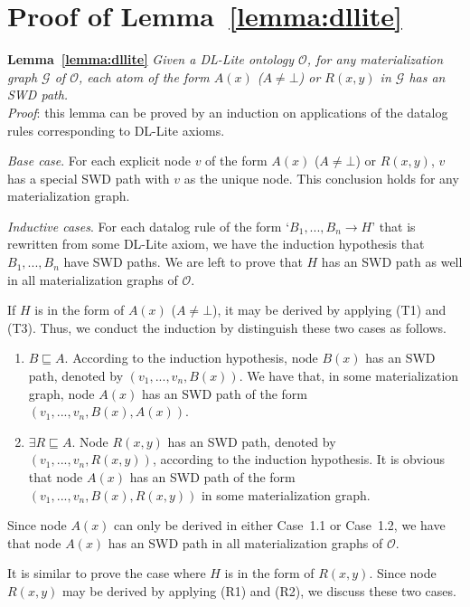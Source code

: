 \section{Proof of Lemma~\ref{lemma:dllite}}

\textbf{Lemma~\ref{lemma:dllite}}
\emph{Given a DL-Lite ontology $\mathcal{O}$, for any materialization graph $\mathcal{G}$ of $\mathcal{O}$,
each atom of the form $A(x)$ ($A\neq\bot$) or $R(x,y)$ in $\mathcal{G}$ has an SWD path.}\\

\noindent\emph{Proof}: this lemma can be proved by an induction on applications of
the datalog rules corresponding to DL-Lite axioms.

\emph{Base case}. For each explicit node $v$ of the form $A(x)$ ($A\neq\bot$) or $R(x,y)$,
$v$ has a special SWD path with $v$ as the unique node. This conclusion holds
for any materialization graph.

\emph{Inductive cases}. For each datalog rule of the form `$B_1,...,B_n\rightarrow H$'
that is rewritten from some DL-Lite axiom, we have the induction hypothesis
that $B_1,...,B_n$ have SWD paths.
We are left to prove that $H$ has an SWD path as well
in all materialization graphs of $\mathcal{O}$.

If $H$ is in the form of $A(x)$ ($A\neq\bot$), it may be derived by
applying (T1) and (T3). Thus, we conduct the induction by
distinguish these two cases as follows.

\begin{enumerate}[leftmargin=12ex,label=Case~1.\arabic*]
\item $B\sqsubseteq A$. According to the induction hypothesis,
node $B(x)$ has an SWD path, denoted by $(v_1,...,v_n,B(x))$.
We have that, in some materialization graph, node $A(x)$
has an SWD path of the form $(v_1,...,v_n,B(x),A(x))$.

\item $\exists R\sqsubseteq A$. Node $R(x,y)$ has an SWD path,
denoted by $(v_1,...,v_n,R(x,y))$,
according to the induction hypothesis.
It is obvious that node $A(x)$
has an SWD path of the form $(v_1,...,v_n,B(x),R(x,y))$
in some materialization graph.
\end{enumerate}

Since node $A(x)$ can only be derived in either Case~1.1
or Case~1.2, we have that
node $A(x)$ has an SWD path in all materialization graphs of $\mathcal{O}$.

It is similar to prove the case where $H$ is in the form of $R(x,y)$.
Since node $R(x,y)$ may be derived by
applying (R1) and (R2), we discuss these two cases.

